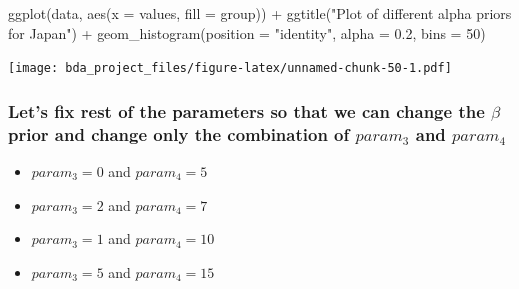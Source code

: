 \documentclass[
]{article}
\newenvironment{Shaded}{\begin{snugshade}}{\end{snugshade}}
\newcommand{\AttributeTok}[1]{\textcolor[rgb]{0.77,0.63,0.00}{#1}}
\newcommand{\DecValTok}[1]{\textcolor[rgb]{0.00,0.00,0.81}{#1}}
\newcommand{\FloatTok}[1]{\textcolor[rgb]{0.00,0.00,0.81}{#1}}
\newcommand{\FunctionTok}[1]{\textcolor[rgb]{0.00,0.00,0.00}{#1}}
\newcommand{\NormalTok}[1]{#1}
\newcommand{\SpecialCharTok}[1]{\textcolor[rgb]{0.00,0.00,0.00}{#1}}
\newcommand{\StringTok}[1]{\textcolor[rgb]{0.31,0.60,0.02}{#1}}
\providecommand{\tightlist}{%
  \setlength{\itemsep}{0pt}\setlength{\parskip}{0pt}}
\begin{document}
\begin{Shaded}
\begin{Highlighting}[]
\FunctionTok{ggplot}\NormalTok{(data, }\FunctionTok{aes}\NormalTok{(}\AttributeTok{x =}\NormalTok{ values, }\AttributeTok{fill =}\NormalTok{ group)) }\SpecialCharTok{+} \FunctionTok{ggtitle}\NormalTok{(}\StringTok{"Plot of different alpha priors for Japan"}\NormalTok{) }\SpecialCharTok{+}
  \FunctionTok{geom\_histogram}\NormalTok{(}\AttributeTok{position =} \StringTok{"identity"}\NormalTok{, }\AttributeTok{alpha =} \FloatTok{0.2}\NormalTok{, }\AttributeTok{bins =} \DecValTok{50}\NormalTok{)}
\end{Highlighting}
\end{Shaded}

\texttt{[image: bda\_project\_files/figure-latex/unnamed-chunk-50-1.pdf]}

\hypertarget{lets-fix-rest-of-the-parameters-so-that-we-can-change-the-beta-prior-and-change-only-the-combination-of-param_3-and-param_4}{%
\subsubsection{\texorpdfstring{Let's fix rest of the parameters so that
we can change the \(\beta\) prior and change only the combination of
\(param_3\) and
\(param_4\)}{Let's fix rest of the parameters so that we can change the \textbackslash beta prior and change only the combination of param\_3 and param\_4}}\label{lets-fix-rest-of-the-parameters-so-that-we-can-change-the-beta-prior-and-change-only-the-combination-of-param_3-and-param_4}}

\begin{itemize}
\tightlist
\item
  \(param_3 = 0\) and \(param_4 = 5\)
\item
  \(param_3 = 2\) and \(param_4 = 7\)
\item
  \(param_3 = 1\) and \(param_4 = 10\)
\item
  \(param_3 = 5\) and \(param_4 = 15\)
\end{itemize}
\end{document}
